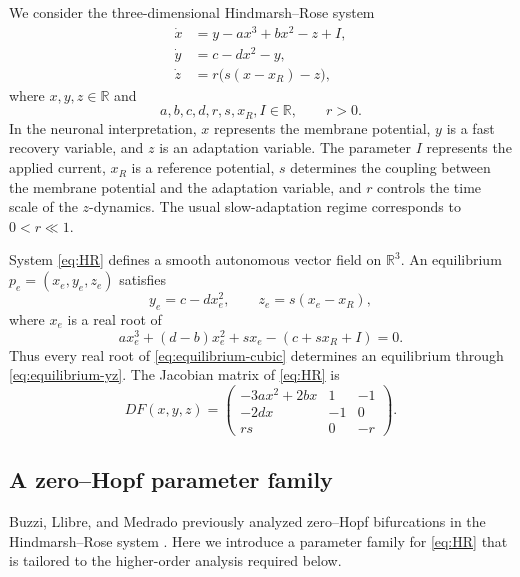 \documentclass[11pt]{amsart}
\theoremstyle{remark}
\newcommand{\R}{\mathbb{R}}
\begin{document}
We consider the three-dimensional Hindmarsh--Rose system
\cite{HindmarshRose1984}
\begin{equation}\label{eq:HR}
\begin{aligned}
\dot{x} &= y-ax^3+bx^2-z+I,\\
\dot{y} &= c-dx^2-y,\\
\dot{z} &= r\bigl(s(x-x_R)-z\bigr),
\end{aligned}
\end{equation}
where \(x,y,z\in\R\) and
\[
 a,b,c,d,r,s,x_R,I\in\R,\qquad r>0.
\]
In the neuronal interpretation, \(x\) represents the membrane potential,
\(y\) is a fast recovery variable, and \(z\) is an adaptation variable.  The
parameter \(I\) represents the applied current, \(x_R\) is a reference
potential, \(s\) determines the coupling between the membrane potential and
the adaptation variable, and \(r\) controls the time scale of the
\(z\)-dynamics.  The usual slow-adaptation regime corresponds to
\(0<r\ll1\).

System \eqref{eq:HR} defines a smooth autonomous vector field on \(\R^3\).
An equilibrium \(p_e=(x_e,y_e,z_e)\) satisfies
\begin{equation}\label{eq:equilibrium-yz}
 y_e=c-dx_e^2,\qquad z_e=s(x_e-x_R),
\end{equation}
where \(x_e\) is a real root of
\begin{equation}\label{eq:equilibrium-cubic}
 ax_e^3+(d-b)x_e^2+s x_e-(c+s x_R+I)=0.
\end{equation}
Thus every real root of \eqref{eq:equilibrium-cubic} determines an
equilibrium through \eqref{eq:equilibrium-yz}.  The Jacobian matrix of
\eqref{eq:HR} is
\begin{equation}\label{eq:jacobian}
 DF(x,y,z)=
 \begin{pmatrix}
 -3ax^2+2bx & 1 & -1\\
 -2dx & -1 & 0\\
 rs & 0 & -r
 \end{pmatrix}.
\end{equation}

\subsection{A zero--Hopf parameter family}

Buzzi, Llibre, and Medrado previously analyzed zero--Hopf bifurcations in
the Hindmarsh--Rose system \cite{BuzziLlibreMedrado2016}.  Here we introduce
a parameter family for \eqref{eq:HR} that is tailored to the higher-order
analysis required below.
\end{document}
